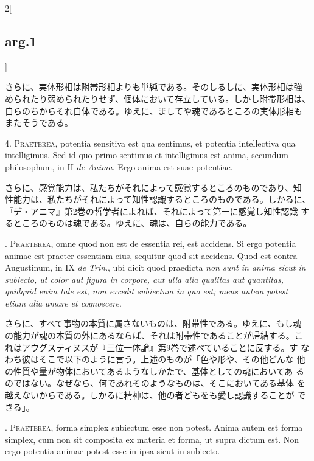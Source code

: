 \documentclass[paper=a4paper,fontsize=10pt,jafontsize=9pt,titlepage]{jlreq}
\begin{document}
\begin{paracol}{2}[\subsection{arg.1}]
\switchcolumn

さらに、実体形相は附帯形相よりも単純である。そのしるしに、実体形相は強
められたり弱められたりせず、個体において存立している。しかし附帯形相は、
自らのちからそれ自体である。ゆえに、ましてや魂であるところの実体形相も
またそうである。


4. {\scshape Praeterea}, potentia sensitiva est qua sentimus, et
potentia intellectiva qua intelligimus. Sed id quo primo sentimus et
intelligimus est anima, secundum philosophum, in II {\itshape de
Anima}. Ergo anima est suae potentiae.

\switchcolumn

さらに、感覚能力は、私たちがそれによって感覚するところのものであり、知
性能力は、私たちがそれによって知性認識するところのものである。しかるに、
『デ・アニマ』第2巻の哲学者によれば、それによって第一に感覚し知性認識
するところのものは魂である。ゆえに、魂は、自らの能力である。

. {\scshape Praeterea}, omne quod non est de essentia rei, est
accidens. Si ergo potentia animae est praeter essentiam eius, sequitur
quod sit accidens. Quod est contra Augustinum, in IX {\itshape de
Trin}., ubi dicit quod praedicta {\itshape non sunt in anima sicut in
subiecto, ut color aut figura in corpore, aut ulla alia qualitas aut
quantitas, quidquid enim tale est, non excedit subiectum in quo est;
mens autem potest etiam alia amare et cognoscere}.

\switchcolumn

さらに、すべて事物の本質に属さないものは、附帯性である。ゆえに、もし魂
の能力が魂の本質の外にあるならば、それは附帯性であることが帰結する。こ
れはアウグスティヌスが『三位一体論』第9巻で述べていることに反する。す
なわち彼はそこで以下のように言う。上述のものが「色や形や、その他どんな
他の性質や量が物体においてあるようなしかたで、基体としての魂においてあ
るのではない。なぜなら、何であれそのようなものは、そこにおいてある基体
を越えないからである。しかるに精神は、他の者どもをも愛し認識することが
できる」。



. {\scshape Praeterea}, forma simplex subiectum esse non
potest. Anima autem est forma simplex, cum non sit composita ex
materia et forma, ut supra dictum est. Non ergo potentia animae potest
esse in ipsa sicut in subiecto.


\end{paracol}
\end{document}
